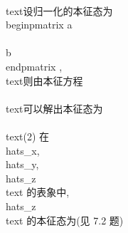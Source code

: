 \\text{设归一化的本征态为 }
\\begin{pmatrix}
a \\\\
b
\\end{pmatrix}
, \\text{则由本征方程}
\\[\\begin{pmatrix}B - \\lambda & -iA \\\\iA & -B - \\lambda\\end{pmatrix}\\begin{pmatrix}a \\\\b\\end{pmatrix}= \\lambda\\begin{pmatrix}a \\\\b\\end{pmatrix}\\]

\\text{可以解出本征态为}
\\[\\Psi_{\\pm} = \\frac{1}{\\sqrt{2}}\\begin{pmatrix}\\frac{1}{\\sqrt{A^2 + (B \\pm \\sqrt{A^2 + B^2})^2}} \\\\\\frac{iA}{B \\pm \\sqrt{A^2 + B^2}}\\end{pmatrix}\\]

\\text{(2) 在 } \\hat{s}_x, \\hat{s}_y, \\hat{s}_z \\text{ 的表象中, } \\hat{s}_z \\text{ 的本征态为(见 7.2 题)}
\\[\\hat{s}_z = \\pm \\frac{h}{2} = \\pm \\frac{1}{\\sqrt{2}}\\begin{pmatrix}1 \\\\1\\end{pmatrix}\\]
